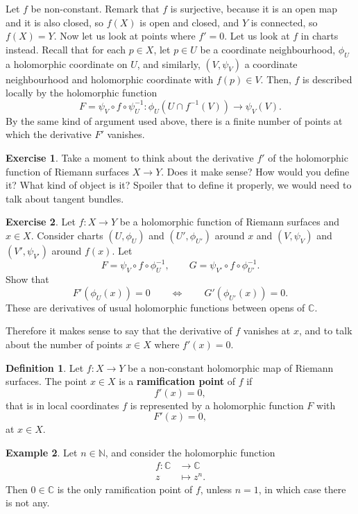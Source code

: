 \documentclass{article}
\newcommand{\N}{\mathbb{N}}
\newcommand{\C}{\mathbb{C}}
\newcommand{\rb}[1]{\left( #1 \right)}
\theoremstyle{definition}\newtheorem{definition}{Definition}[section]
\theoremstyle{definition}\newtheorem{notation}[definition]{Notation}
\theoremstyle{definition}\newtheorem{remark}[definition]{Remark}
\theoremstyle{definition}\newtheorem{example1}[definition]{Example}
\theoremstyle{definition}\newtheorem{fact}{Fact}
\theoremstyle{definition}\newtheorem{exercise}{Exercise}
\theoremstyle{definition}\newtheorem*{example2}{Example}
\begin{document}
Let $ f $ be non-constant. Remark that $ f $ is surjective, because it is an open map and it is also closed, so $ f\rb{X} $ is open and closed, and $ Y $ is connected, so $ f\rb{X} = Y $. Now let us look at points where $ f' = 0 $. Let us look at $ f $ in charts instead. Recall that for each $ p \in X $, let $ p \in U $ be a coordinate neighbourhood, $ \phi_U $ a holomorphic coordinate on $ U $, and similarly, $ \rb{V, \psi_V} $ a coordinate neighbourhood and holomorphic coordinate with $ f\rb{p} \in V $. Then, $ f $ is described locally by the holomorphic function
$$ F = \psi_V \circ f \circ \psi_U^{-1} : \phi_U\rb{U \cap f^{-1}\rb{V}} \to \psi_V\rb{V}. $$
By the same kind of argument used above, there is a finite number of points at which the derivative $ F' $ vanishes.

\begin{exercise}
Take a moment to think about the derivative $ f' $ of the holomorphic function of Riemann surfaces $ X \to Y $. Does it make sense? How would you define it? What kind of object is it? Spoiler that to define it properly, we would need to talk about tangent bundles.
\end{exercise}

\begin{exercise}
Let $ f : X \to Y $ be a holomorphic function of Riemann surfaces and $ x \in X $. Consider charts $ \rb{U, \phi_U} $ and $ \rb{U', \phi_{U'}} $ around $ x $ and $ \rb{V, \psi_V} $ and $ \rb{V', \psi_{V'}} $ around $ f\rb{x} $. Let
$$ F = \psi_V \circ f \circ \phi_U^{-1}, \qquad G = \psi_{V'} \circ f \circ \phi_{U'}^{-1}. $$
Show that
$$ F'\rb{\phi_U\rb{x}} = 0 \qquad \iff \qquad G'\rb{\phi_{U'}\rb{x}} = 0. $$
These are derivatives of usual holomorphic functions between opens of $ \C $.
\end{exercise}

Therefore it makes sense to say that the derivative of $ f $ vanishes at $ x $, and to talk about the number of points $ x \in X $ where $ f'\rb{x} = 0 $.

\begin{definition}
Let $ f : X \to Y $ be a non-constant holomorphic map of Riemann surfaces. The point $ x \in X $ is a \textbf{ramification point} of $ f $ if
$$ f'\rb{x} = 0, $$
that is in local coordinates $ f $ is represented by a holomorphic function $ F $ with
$$ F'\rb{x} = 0, $$
at $ x \in X $.
\end{definition}

\begin{example1}
\label{eg:17.9}
Let $ n \in \N $, and consider the holomorphic function
\begin{align*}
f : \C & \to \C \\
z & \mapsto z^n.
\end{align*}
Then $ 0 \in \C $ is the only ramification point of $ f $, unless $ n = 1 $, in which case there is not any.
\end{example1}
\end{document}
